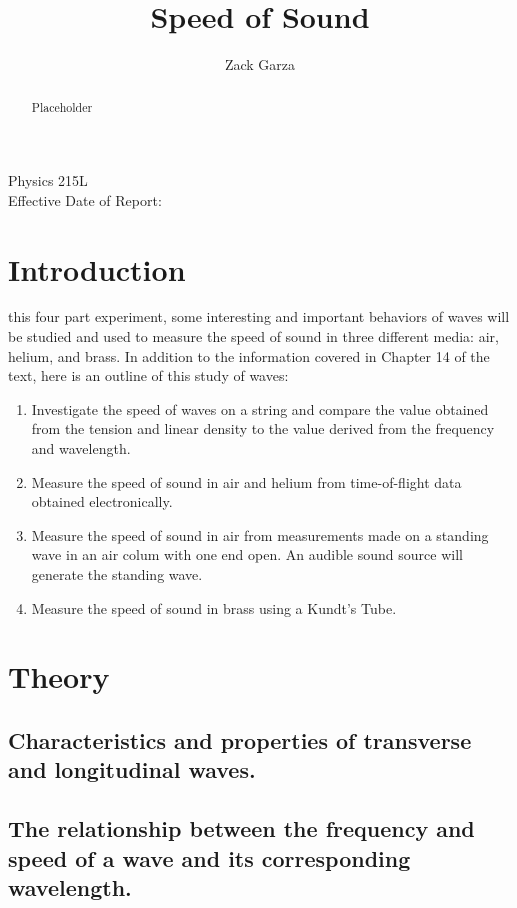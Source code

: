 \documentclass[twocolumn,english]{IEEEtran}
\theoremstyle{plain}
\theoremstyle{plain}
\begin{document}
\title{Speed of Sound}


\author{Zack Garza}


\IEEEspecialpapernotice
{Physics 215L \\
Effective Date of Report: }


\maketitle
\begin{abstract}
Placeholder
\end{abstract}
\tableofcontents

\section{Introduction}
 this four part experiment, some interesting and important behaviors of waves will be studied and used to measure the speed of sound in three different media: air, helium, and brass.
In addition to the information covered in Chapter 14 of the text, here is an outline of this study of waves:

\begin{enumerate}
 \item Investigate the speed of waves on a string and compare the value obtained from the tension and linear density to the value derived from the frequency and wavelength.
 \item Measure the speed of sound in air and helium from time-of-flight data obtained electronically.
 \item Measure the speed of sound in air from measurements made on a standing wave in an air colum with one end open.
 An audible sound source will generate the standing wave.
 \item Measure the speed of sound in brass using a Kundt's Tube.
\end{enumerate}

\section{Theory}
\subsection*{Characteristics and properties of transverse and longitudinal waves.}

\subsection*{The relationship between the frequency and speed of a wave and its corresponding wavelength.}
\end{document}
